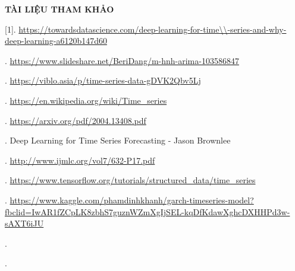 \newpage
\changefontsizes{16pt}
\centerline{\textbf{TÀI LIỆU THAM KHẢO}}

\bigskip
\bigskip
\changefontsizes{13pt}
\setlength{\parindent}{0cm}
[1].
\url{https://towardsdatascience.com/deep-learning-for-time\\-series-and-why-deep-learning-a6120b147d60}

\smallskip
[2]. 
\url{https://www.slideshare.net/BeriDang/m-hnh-arima-103586847}

\smallskip
[3].
\url{https://viblo.asia/p/time-series-data-gDVK2Qbv5Lj}

\smallskip
[4].
\url{https://en.wikipedia.org/wiki/Time\_series}

\smallskip
[5].
\url{https://arxiv.org/pdf/2004.13408.pdf}

\smallskip
[6].
Deep Learning for Time Series Forecasting - Jason Brownlee

\smallskip
[7].
\url{http://www.ijmlc.org/vol7/632-P17.pdf}

\smallskip
[8].
\url{https://www.tensorflow.org/tutorials/structured\_data/time\_series}

\smallskip
[9].
\url{https://www.kaggle.com/phamdinhkhanh/garch-timeseries-model?fbclid=IwAR1fZCpLK8zbhS7guznWZmXgIjSEL-kqDfKdawXghcDXHHPd3w-sAXT6iJU}

\smallskip
[10].


\smallskip
[11].

